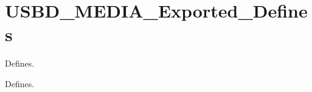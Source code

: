\hypertarget{group__USBD__MEDIA__Exported__Defines}{}\section{U\+S\+B\+D\+\_\+\+M\+E\+D\+I\+A\+\_\+\+Exported\+\_\+\+Defines}
\label{group__USBD__MEDIA__Exported__Defines}


Defines.  


Defines. 

